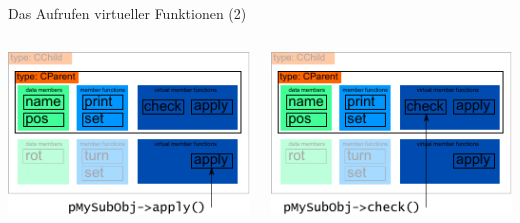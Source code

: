 \begin{frame}[fragile]{Das Aufrufen virtueller Funktionen (2)}
	\begin{columns}
		\includegraphics[width=\textwidth]{images/pMySubObj-virtApply}
		
		\includegraphics[width=\textwidth]{images/pMySubObj-virtCheck}
	\end{columns}
\end{frame}

